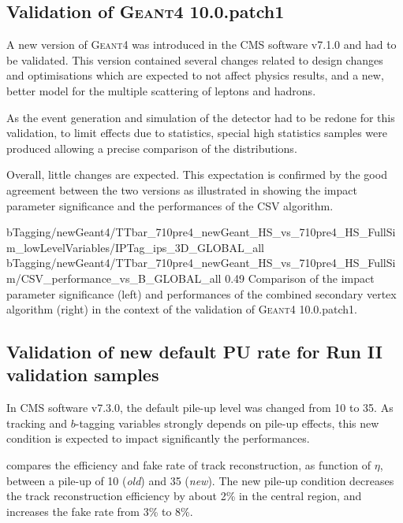         \subsection{Validation of \textsc{Geant4} 10.0.patch1}

        A new version of \textsc{Geant4} was introduced in the CMS software v7.1.0 and
        had to be validated. This version contained several changes related to design
        changes and optimisations which are expected to not affect physics results,
        and a new, better model for the multiple scattering of leptons and hadrons.

        As the event generation and simulation of the detector had to be redone for
        this validation, to limit effects due to statistics, special high statistics
        samples were produced allowing a precise comparison of the distributions.

        Overall, little changes are expected. This expectation is confirmed by the
        good agreement between the two versions as illustrated in 
        showing the impact parameter significance and the performances of the CSV algorithm.

                         {bTagging/newGeant4/TTbar_710pre4_newGeant_HS_vs_710pre4_HS_FullSim_lowLevelVariables/IPTag_ips_3D_GLOBAL_all}
                         {bTagging/newGeant4/TTbar_710pre4_newGeant_HS_vs_710pre4_HS_FullSim/CSV_performance_vs_B_GLOBAL_all}
                         {0.49}
                         {Comparison of the impact parameter significance (left) and
                         performances of the combined secondary vertex algorithm (right)
                         in the context of the validation of \textsc{Geant4} 10.0.patch1.}

        \subsection{Validation of new default PU rate for Run II validation samples}

        In CMS software v7.3.0, the default pile-up level was changed from 10 to 35. As
        tracking and $b$-tagging variables strongly depends on pile-up effects, this
        new condition is expected to impact significantly the performances.

         compares the efficiency and fake rate of track
        reconstruction, as function of $\eta$, between a pile-up of 10 (\emph{old}) and
        35 (\emph{new}). The new pile-up condition decreases the track reconstruction
        efficiency by about 2\% in the central region, and increases the fake rate from
        3\% to 8\%.

